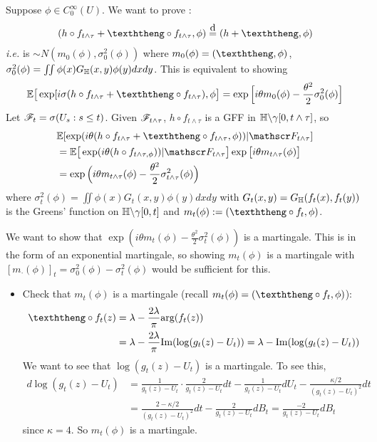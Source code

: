 \documentclass[12pt,a4paper]{article}
\newcommand\xeq{\stackrel{\mathclap{\normalfont\mbox{d}}}{=}}
\newenvironment{proof}
{\begin{changemargin}{0.5cm}{0.5cm} 
	}%
	{\end{changemargin}
}
\renewenvironment{i}
{\begin{itemize} 
	}%
	{\end{itemize}
}
\newenvironment{p}
{\begin{proof} 
	}%
	{\end{proof}
}
\begin{document}
\begin{p}
\pf Suppose $\phi \in C_0^{\infty} (U)$. We want to prove :
\begin{align*}
(h\circ f_{t\wedge \tau} + \hh \circ f_{t\wedge \tau}, \phi) \xeq (h+ \hh, \phi)
\end{align*}
\textit{i.e.} is $\sim N(m_0(\phi), \sigma_0^2(\phi))$ where $m_0(\phi) = (\hh, \phi)$, $\sigma_0^2 (\phi) = \iint \phi(x) G_{\mathbb{H}}(x,y) \phi(y) dxdy$. This is equivalent to showing
\begin{align*}
\avg\big[ \exp[ i\sigma(h\circ f_{t\wedge \tau} + \hh\circ f_{t\wedge \tau}) , \phi \big] = \exp \Big[i\theta m_0(\phi) - \frac{\theta^2}{2} \sigma_0^2(\phi) \Big]
\end{align*}
Let $\mathscr{F}_t = \sigma(U_s : s\leq t)$. Given $\mathscr{F}_{t\wedge \tau}$, $h\circ f_{t\wedge \tau}$ is a GFF in $\mathbb{H} \backslash \gamma[0, t\wedge \tau]$, so
\begin{align*}
& \avg [\exp( i\theta(h\circ f_{t\wedge \tau} + \hh\circ f_{t\wedge \tau} , \phi)) | \FF_{t\wedge \tau}]  \\
& = \avg \big[\exp (i\theta (h\circ f_{t\wedge \tau, \phi})) |\FF_{t\wedge \tau} \big] \exp \big[i\theta m_{t\wedge \tau}(\phi) \big] \\
& = \exp \Big(i\theta m_{t\wedge \tau}(\phi) - \frac{\theta^2}{2} \sigma_{t\wedge \tau}^2(\phi) \Big)
\end{align*}
where $\sigma_t^2 (\phi) = \iint \phi(x) G_t (x,y) \phi(y) dxdy$ with $G_t(x,y) = G_{\mathbb{H}}(f_t(x), f_t(y))$ is the Greens' function on $\mathbb{H} \backslash \gamma[0,t]$ and $m_t(\phi) := (\hh \circ f_t, \phi)$.

\quad We want to show that $\exp(i\theta m_t(\phi) - \frac{\theta^2}{2} \sigma_t^2(\phi))$ is a martingale. This is in the form of an exponential martingale, so showing $m_t(\phi)$ is a martingale with $[m_{\cdot}(\phi)]_t =\sigma_0^2(\phi) - \sigma_t^2(\phi)$ would be sufficient for this.
\begin{i}
\item Check that $m_t(\phi)$ is a martingale (recall $m_t(\phi) = (\hh \circ f_t, \phi)$):
\begin{align*}
\hh \circ f_t(z) &= \lambda - \frac{2\lambda}{\pi} \text{arg}(f_t(z)) \\
& = \lambda - \frac{2\lambda}{\pi} \text{Im}(\log(g_t(z) - U_t)) = \lambda - \text{Im}(\log(g_t(z) - U_t))
\end{align*}
We want to see that $\log(g_t(z) - U_t)$ is a martingale. To see this,
\begin{align*}
d\log (g_t(z) - U_t) &= \frac{1}{g_t(z) -U_t} \cdot \frac{2}{g_t(z) - U_t} dt - \frac{1}{g_t(z) - U_t} dU_t - \frac{\kappa/2}{(g_t(z) - U_t)^2} dt \\
& =\frac{2- \kappa/2}{(g_t(z) -U_t)^2}dt - \frac{2}{g_t(z) - U_t}dB_t = \frac{-2}{g_t(z) - U_t}dB_t
\end{align*}
since $\kappa =4$. So $m_t(\phi)$ is a martingale.


\end{i}
\end{p}
\end{document}
